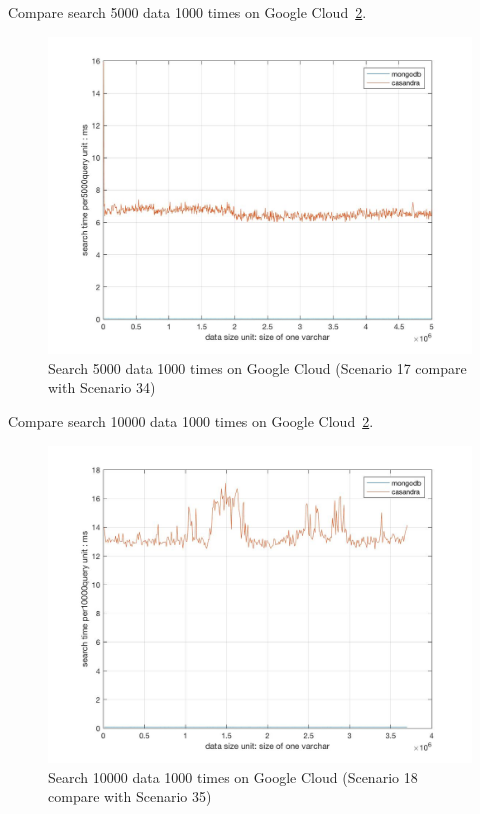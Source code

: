 Compare search 5000 data 1000 times on Google Cloud~\ref{f:fly}.

\begin{figure}[!ht]
  \centering\includegraphics[width=\columnwidth]
  {images/search_comp_5000_google.jpg}
  \caption{Search 5000 data 1000 times on Google Cloud
  (Scenario 17 compare with Scenario 34)}\label{f:fly}
\end{figure}

Compare search 10000 data 1000 times on Google Cloud~\ref{f:fly}.

\begin{figure}[!ht]
  \centering\includegraphics[width=\columnwidth]
  {images/search_comp_10000_google.jpg}
  \caption{Search 10000 data 1000 times on Google Cloud
  (Scenario 18 compare with Scenario 35)}\label{f:fly}
\end{figure}

